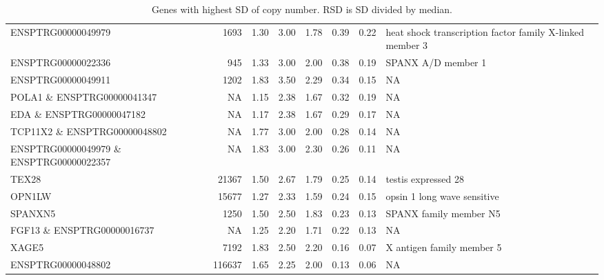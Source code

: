 \begin{table}[h]
\begin{adjustbox}{angle=90}
\begin{tabular}{|l|r|r|r|r|r|r|l|}
ENSPTRG00000049979 & 1693 & 1.30 & 3.00 & 1.78 & 0.39 & 0.22 & heat shock transcription factor family X-linked member 3  \\
ENSPTRG00000022336 & 945 & 1.33 & 3.00 & 2.00 & 0.38 & 0.19 & SPANX A/D member 1  \\
ENSPTRG00000049911 & 1202 & 1.83 & 3.50 & 2.29 & 0.34 & 0.15 & NA \\
POLA1 \& ENSPTRG00000041347 & NA & 1.15 & 2.38 & 1.67 & 0.32 & 0.19 & NA \\
EDA \& ENSPTRG00000047182 & NA & 1.17 & 2.38 & 1.67 & 0.29 & 0.17 & NA \\
TCP11X2 \& ENSPTRG00000048802 & NA & 1.77 & 3.00 & 2.00 & 0.28 & 0.14 & NA \\
ENSPTRG00000049979 \& ENSPTRG00000022357 & NA & 1.83 & 3.00 & 2.30 & 0.26 & 0.11 & NA \\
TEX28 & 21367 & 1.50 & 2.67 & 1.79 & 0.25 & 0.14 & testis expressed 28  \\
OPN1LW & 15677 & 1.27 & 2.33 & 1.59 & 0.24 & 0.15 & opsin 1 long wave sensitive  \\
SPANXN5 & 1250 & 1.50 & 2.50 & 1.83 & 0.23 & 0.13 & SPANX family member N5  \\
FGF13 \& ENSPTRG00000016737 & NA & 1.25 & 2.20 & 1.71 & 0.22 & 0.13 & NA \\
XAGE5 & 7192 & 1.83 & 2.50 & 2.20 & 0.16 & 0.07 & X antigen family member 5  \\
ENSPTRG00000048802 & 116637 & 1.65 & 2.25 & 2.00 & 0.13 & 0.06 & NA \\





\hline

\end{tabular}
\end{adjustbox}
\caption{\label{tab:genes}Genes with highest SD of copy number. RSD is SD divided by median.}
\end{table}


